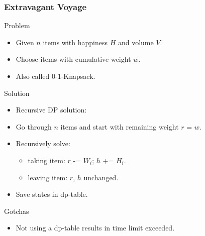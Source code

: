 \documentclass{beamer}
\begin{document}
\begin{frame}
    \frametitle{Extravagant Voyage}
    \begin{block}{Problem}
        \begin{itemize}
            \item Given $n$ items with happiness $H$ and volume $V$.
            \item Choose items with cumulative weight $w$.
            \item Also called 0-1-Knapsack.
        \end{itemize}
    \end{block} \pause
    \begin{block}{Solution}
        \begin{itemize}
            \item Recursive DP solution:
            \item Go through $n$ items and start with remaining weight $r$ = $w$.
            \pause
            \item Recursively solve:
            \pause
            \begin{itemize}
                \item taking item: $r$ -= $W_i$; $h$ += $H_i$.
                \pause
                \item leaving item: $r$, $h$ unchanged.
            \end{itemize}
            \pause
            \item Save states in dp-table.
        \end{itemize}
    \end{block} \pause
    \begin{block}{Gotchas}
        \begin{itemize}
            \item Not using a dp-table results in time limit exceeded.
        \end{itemize}
    \end{block} 
\end{frame}
\end{document}
